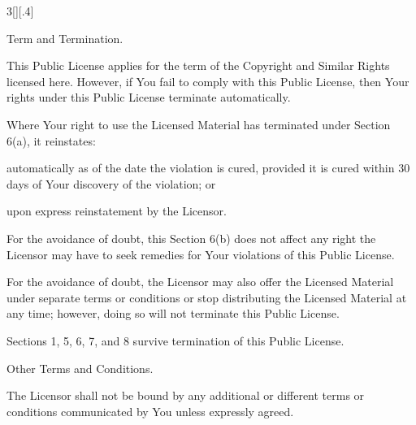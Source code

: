 \documentclass[8pt,a4paper]{article}
\begin{document}
\begin{multicols}{3}[][.4\paperwidth]
\begin{longenum}
\begin{longenum}
  \end{longenum}


 \item Term and Termination.

  \begin{longenum}

  \item This Public License applies for the term of the Copyright and
     Similar Rights licensed here. However, if You fail to comply with
     this Public License, then Your rights under this Public License
     terminate automatically.

  \item Where Your right to use the Licensed Material has terminated under
     Section 6(a), it reinstates:

       \begin{longenum}

       \item automatically as of the date the violation is cured, provided
          it is cured within 30 days of Your discovery of the
          violation; or

       \item upon express reinstatement by the Licensor.

       \end{longenum}

     For the avoidance of doubt, this Section 6(b) does not affect any
     right the Licensor may have to seek remedies for Your violations
     of this Public License.

  \item For the avoidance of doubt, the Licensor may also offer the
     Licensed Material under separate terms or conditions or stop
     distributing the Licensed Material at any time; however, doing so
     will not terminate this Public License.

  \item Sections 1, 5, 6, 7, and 8 survive termination of this Public
     License.

  \end{longenum}

 \item Other Terms and Conditions.

  \begin{longenum}

  \item The Licensor shall not be bound by any additional or different
     terms or conditions communicated by You unless expressly agreed.


\end{longenum}
\end{longenum}
\end{multicols}
\end{document}
